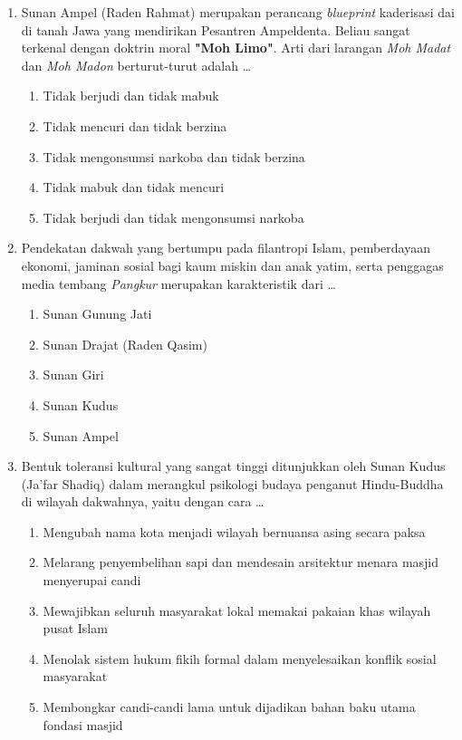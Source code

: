 \documentclass[12pt,a4paper]{article}
\begin{document}
\begin{enumerate}[leftmargin=*]
\item Sunan Ampel (Raden Rahmat) merupakan perancang \textit{blueprint} kaderisasi dai di tanah Jawa yang mendirikan Pesantren Ampeldenta. Beliau sangat terkenal dengan doktrin moral \textbf{"Moh Limo"}. Arti dari larangan \textit{Moh Madat} dan \textit{Moh Madon} berturut-turut adalah \dots
    \begin{enumerate}[label=\alph*.]
        \item Tidak berjudi dan tidak mabuk
        \item Tidak mencuri dan tidak berzina
        \item Tidak mengonsumsi narkoba dan tidak berzina
        \item Tidak mabuk dan tidak mencuri
        \item Tidak berjudi dan tidak mengonsumsi narkoba
    \end{enumerate}

\item Pendekatan dakwah yang bertumpu pada filantropi Islam, pemberdayaan ekonomi, jaminan sosial bagi kaum miskin dan anak yatim, serta penggagas media tembang \textit{Pangkur} merupakan karakteristik dari \dots
    \begin{enumerate}[label=\alph*.]
        \item Sunan Gunung Jati
        \item Sunan Drajat (Raden Qasim)
        \item Sunan Giri
        \item Sunan Kudus
        \item Sunan Ampel
    \end{enumerate}

\item Bentuk toleransi kultural yang sangat tinggi ditunjukkan oleh Sunan Kudus (Ja'far Shadiq) dalam merangkul psikologi budaya penganut Hindu-Buddha di wilayah dakwahnya, yaitu dengan cara \dots
    \begin{enumerate}[label=\alph*.]
        \item Mengubah nama kota menjadi wilayah bernuansa asing secara paksa
        \item Melarang penyembelihan sapi dan mendesain arsitektur menara masjid menyerupai candi
        \item Mewajibkan seluruh masyarakat lokal memakai pakaian khas wilayah pusat Islam
        \item Menolak sistem hukum fikih formal dalam menyelesaikan konflik sosial masyarakat
        \item Membongkar candi-candi lama untuk dijadikan bahan baku utama fondasi masjid
    \end{enumerate}


\end{enumerate}
\end{document}
